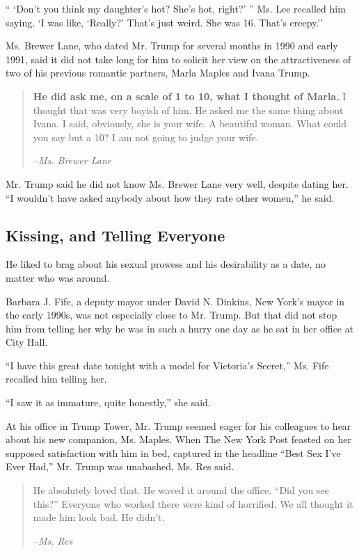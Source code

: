 `` `Don't you think my daughter's hot? She's hot, right?' '' Ms. Lee
recalled him saying. `I was like, `Really?' That's just weird. She was
16. That's creepy.''

Ms. Brewer Lane, who dated Mr. Trump for several months in 1990 and
early 1991, said it did not take long for him to solicit her view on the
attractiveness of two of his previous romantic partners, Marla Maples
and Ivana Trump.

\begin{quote}
\textbf{He did ask me, on a scale of 1 to 10, what I thought of Marla.}
I thought that was very boyish of him. He asked me the same thing about
Ivana. I said, obviously, she is your wife. A beautiful woman. What
could you say but a 10? I am not going to judge your wife.

\emph{--Ms. Brewer Lane}
\end{quote}

Mr. Trump said he did not know Ms. Brewer Lane very well, despite dating
her. ``I wouldn't have asked anybody about how they rate other women,''
he said.

\hypertarget{kissing-and-telling-everyone}{%
\subsection{Kissing, and Telling
Everyone}\label{kissing-and-telling-everyone}}

He liked to brag about his sexual prowess and his desirability as a
date, no matter who was around.

Barbara J. Fife, a deputy mayor under David N. Dinkins, New York's mayor
in the early 1990s, was not especially close to Mr. Trump. But that did
not stop him from telling her why he was in such a hurry one day as he
sat in her office at City Hall.

``I have this great date tonight with a model for Victoria's Secret,''
Ms. Fife recalled him telling her.

``I saw it as immature, quite honestly,'' she said.

At his office in Trump Tower, Mr. Trump seemed eager for his colleagues
to hear about his new companion, Ms. Maples. When The New York Post
feasted on her supposed satisfaction with him in bed, captured in the
headline ``Best Sex I've Ever Had,'' Mr. Trump was unabashed, Ms. Res
said.

\begin{quote}
He absolutely loved that. He waved it around the office. ``Did you see
this?'' Everyone who worked there were kind of horrified. We all thought
it made him look bad. He didn't.

\emph{--Ms. Res}
\end{quote}

